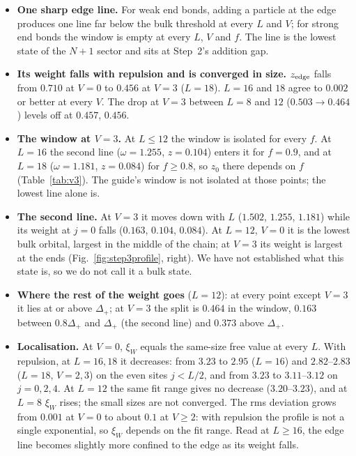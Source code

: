 \documentclass[11pt,a4paper]{article}
\begin{document}
\begin{itemize}
  \item \textbf{One sharp edge line.} For weak end bonds, adding a particle at the edge produces one line far below the bulk threshold at every $L$ and $V$; for strong end bonds the window is empty at every $L$, $V$ and $f$.
  The line is the lowest state of the $N+1$ sector and sits at Step~2's addition gap.
  \item \textbf{Its weight falls with repulsion and is converged in size.} $z_{\rm edge}$ falls from $0.710$ at $V=0$ to $0.456$ at $V=3$ ($L=18$).
  $L=16$ and $18$ agree to $0.002$ or better at every $V$.
  The drop at $V=3$ between $L=8$ and $12$ ($0.503\to0.464$) levels off at $0.457$, $0.456$.
  \item \textbf{The window at $V=3$.} At $L\le12$ the window is isolated for every $f$.
  At $L=16$ the second line ($\omega=1.255$, $z=0.104$) enters it for $f=0.9$, and at $L=18$ ($\omega=1.181$, $z=0.084$) for $f\ge0.8$, so $z_0$ there depends on $f$ (Table~\ref{tab:v3}).
  The guide's window is not isolated at those points; the lowest line alone is.
  \item \textbf{The second line.} At $V=3$ it moves down with $L$ ($1.502$, $1.255$, $1.181$) while its weight at $j=0$ falls ($0.163$, $0.104$, $0.084$).
  At $L=12$, $V=0$ it is the lowest bulk orbital, largest in the middle of the chain; at $V=3$ its weight is largest at the ends (Fig.~\ref{fig:step3profile}, right).
  We have not established what this state is, so we do not call it a bulk state.
  \item \textbf{Where the rest of the weight goes} ($L=12$): at every point except $V=3$ it lies at or above $\Delta_+$; at $V=3$ the split is $0.464$ in the window, $0.163$ between $0.8\Delta_+$ and $\Delta_+$ (the second line) and $0.373$ above $\Delta_+$.
  \item \textbf{Localisation.} At $V=0$, $\xi_W$ equals the same-size free value at every $L$.
  With repulsion, at $L=16,18$ it decreases: from $3.23$ to $2.95$ ($L=16$) and $2.82$--$2.83$ ($L=18$, $V=2,3$) on the even sites $j<L/2$, and from $3.23$ to $3.11$--$3.12$ on $j=0,2,4$.
  At $L=12$ the same fit range gives no decrease ($3.20$--$3.23$), and at $L=8$ $\xi_W$ rises; the small sizes are not converged.
  The rms deviation grows from $0.001$ at $V=0$ to about $0.1$ at $V\ge2$: with repulsion the profile is not a single exponential, so $\xi_W$ depends on the fit range.
  Read at $L\ge16$, the edge line becomes slightly more confined to the edge as its weight falls.

\end{itemize}
\end{document}
